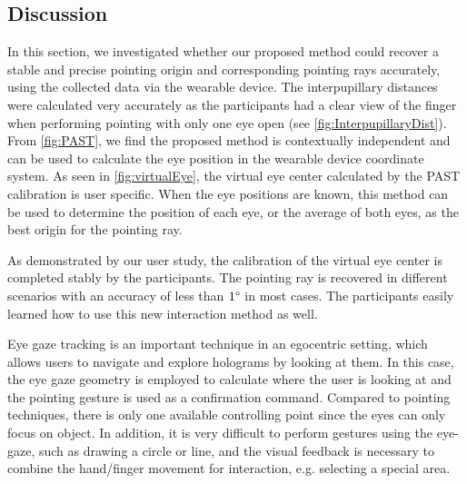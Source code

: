 \subsection{Discussion}
In this section, we investigated whether our proposed method could recover a stable and precise pointing origin and corresponding pointing rays accurately, using the collected data via the wearable device. 
The interpupillary distances were calculated very accurately as the participants had a clear view of the finger when performing pointing with only one eye open  (see \figurename{ \ref{fig:InterpupillaryDist}}). 
From \figurename{ \ref{fig:PAST}}, we find the proposed method is contextually independent and can be used to calculate the eye position in the wearable device coordinate system. 
As seen in \figurename{ \ref{fig:virtualEye}}, the virtual eye center calculated by the PAST calibration is user specific. When the eye positions are known, this method can be used to determine the position of each eye, or the average of both eyes, as the best origin for the pointing ray.

{As demonstrated by our user study, the calibration of the virtual eye center is completed stably by the participants. The pointing ray is recovered in different scenarios with an accuracy of less than $1\degree$ in most cases. }
The participants easily learned how to use this new interaction method as well.

Eye gaze tracking is an important technique in an egocentric setting, %
which allows users to navigate and explore holograms by looking at them. %
In this case, the eye gaze geometry is employed to calculate where the user is looking at and the pointing gesture is used as a confirmation command. 
Compared to pointing techniques, there is only one available controlling point since the eyes can only focus on object. In addition, it is very difficult to perform gestures using the eye-gaze, such as drawing a circle or line, and the visual feedback is necessary to combine the hand/finger movement for interaction, e.g. selecting a special area.

